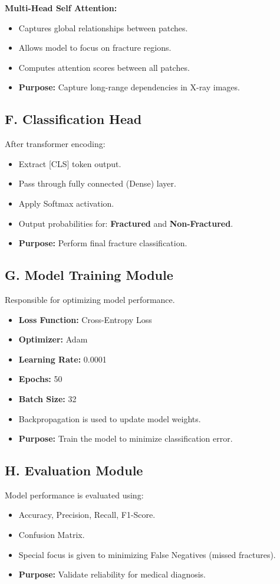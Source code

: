 \documentclass[a4paper,12pt]{report}
\begin{document}
    \textbf{Multi-Head Self Attention:}
    \begin{itemize}
        \item Captures global relationships between patches.
        \item Allows model to focus on fracture regions.
        \item Computes attention scores between all patches.
        \item \textbf{Purpose:} Capture long-range dependencies in X-ray images.
    \end{itemize}

    \subsection*{F. Classification Head}
    After transformer encoding:
    \begin{itemize}
        \item Extract [CLS] token output.
        \item Pass through fully connected (Dense) layer.
        \item Apply Softmax activation.
        \item Output probabilities for: \textbf{Fractured} and \textbf{Non-Fractured}.
        \item \textbf{Purpose:} Perform final fracture classification.
    \end{itemize}

    \subsection*{G. Model Training Module}
    Responsible for optimizing model performance.
    \begin{itemize}
        \item \textbf{Loss Function:} Cross-Entropy Loss
        \item \textbf{Optimizer:} Adam
        \item \textbf{Learning Rate:} 0.0001
        \item \textbf{Epochs:} 50
        \item \textbf{Batch Size:} 32
        \item Backpropagation is used to update model weights.
        \item \textbf{Purpose:} Train the model to minimize classification error.
    \end{itemize}

    \subsection*{H. Evaluation Module}
    Model performance is evaluated using:
    \begin{itemize}
        \item Accuracy, Precision, Recall, F1-Score.
        \item Confusion Matrix.
        \item Special focus is given to minimizing False Negatives (missed fractures).
        \item \textbf{Purpose:} Validate reliability for medical diagnosis.
    \end{itemize}
\end{document}
